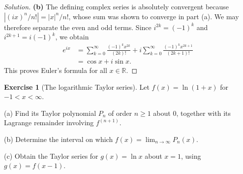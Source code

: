 \documentclass[11pt,letterpaper]{article}
\newcommand{\R}{\mathbb{R}}
\theoremstyle{definition}
\newtheorem{exercise}{Exercise}
\begin{document}
\begin{proof}[Solution]
  \textbf{(b)} The defining complex series is absolutely convergent
  because $|(ix)^n/n!|=|x|^n/n!$, whose sum was shown to converge in
  part (a). We may therefore separate the even and odd terms.
  Since $i^{2k}=(-1)^k$ and
  $i^{2k+1}=i(-1)^k$, we obtain
  \[
    \begin{aligned}
      e^{ix}
        &=\sum_{k=0}^{\infty}\frac{(-1)^k x^{2k}}{(2k)!}
          +i\sum_{k=0}^{\infty}\frac{(-1)^k x^{2k+1}}{(2k+1)!}\\
        &=\cos x+i\sin x.
    \end{aligned}
  \]
  This proves Euler's formula for all $x\in\R$.
\end{proof}

\begin{exercise}[The logarithmic Taylor series]
  \label{ex:standalone-hw08:logarithmic-series}
  Let $f(x)=\ln(1+x)$ for $-1<x<\infty$.

  \textup{(a)} Find its Taylor polynomial $P_n$ of order $n\ge1$ about
  $0$, together with its Lagrange remainder involving $f^{(n+1)}$.

  \textup{(b)} Determine the interval on which
  $f(x)=\lim_{n\to\infty}P_n(x)$.

  \textup{(c)} Obtain the Taylor series for $g(x)=\ln x$ about $x=1$,
  using $g(x)=f(x-1)$.
\end{exercise}
\end{document}
